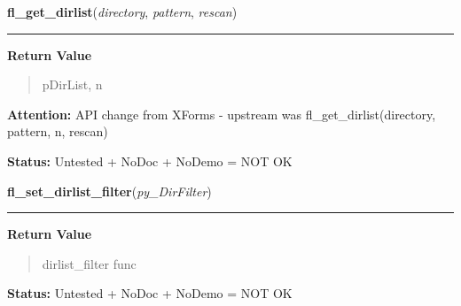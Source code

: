     \label{xformslib:flfilesys:fl_get_dirlist}

    \vspace{0.5ex}

\hspace{.8\funcindent}\begin{boxedminipage}{\funcwidth}

    \raggedright \textbf{fl\_get\_dirlist}(\textit{directory}, \textit{pattern}, \textit{rescan})

    \vspace{-1.5ex}

    \rule{\textwidth}{0.5\fboxrule}
\setlength{\parskip}{2ex}
\setlength{\parskip}{1ex}
      \textbf{Return Value}
    \vspace{-1ex}

      \begin{quote}
      pDirList, n

      \end{quote}

\textbf{Attention:} API change from XForms - upstream was fl\_get\_dirlist(directory, pattern, 
n, rescan)



\textbf{Status:} Untested + NoDoc + NoDemo = NOT OK



    \end{boxedminipage}

    \label{xformslib:flfilesys:fl_set_dirlist_filter}

    \vspace{0.5ex}

\hspace{.8\funcindent}\begin{boxedminipage}{\funcwidth}

    \raggedright \textbf{fl\_set\_dirlist\_filter}(\textit{py\_DirFilter})

    \vspace{-1.5ex}

    \rule{\textwidth}{0.5\fboxrule}
\setlength{\parskip}{2ex}
\setlength{\parskip}{1ex}
      \textbf{Return Value}
    \vspace{-1ex}

      \begin{quote}
      dirlist\_filter func

      \end{quote}

\textbf{Status:} Untested + NoDoc + NoDemo = NOT OK



    \end{boxedminipage}

